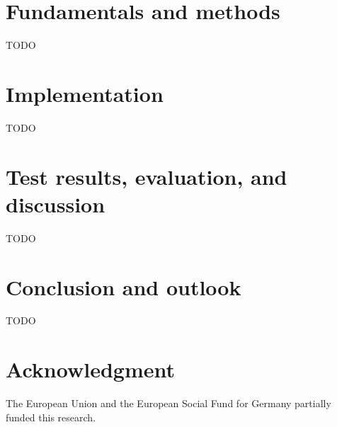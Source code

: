 \documentclass[conference]{IEEEtran}
\begin{document}
\section{Fundamentals and methods}

TODO


\section{Implementation}

TODO


\section{Test results, evaluation, and discussion}

TODO


\section{Conclusion and outlook}

TODO


\section*{Acknowledgment}

The European Union and the European Social Fund for Germany partially funded this research.




\end{document}

